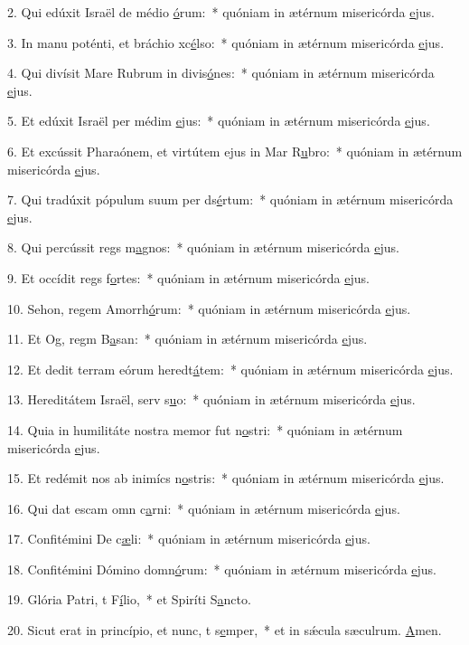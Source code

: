 2. Qui edúxit Israël de médio \uline{ó}rum:~* quóniam in ætérnum misericórda \uline{e}jus.\par 
3. In manu poténti, et bráchio xc\uline{é}lso:~* quóniam in ætérnum misericórda \uline{e}jus.\par 
4. Qui divísit Mare Rubrum in divis\uline{ó}nes:~* quóniam in ætérnum misericórda \uline{e}jus.\par 
5. Et edúxit Israël per médim \uline{e}jus:~* quóniam in ætérnum misericórda \uline{e}jus.\par 
6. Et excússit Pharaónem, et virtútem ejus in Mar R\uline{u}bro:~* quóniam in ætérnum misericórda \uline{e}jus.\par 
7. Qui tradúxit pópulum suum per ds\uline{é}rtum:~* quóniam in ætérnum misericórda \uline{e}jus.\par 
8. Qui percússit regs m\uline{a}gnos:~* quóniam in ætérnum misericórda \uline{e}jus.\par 
9. Et occídit regs f\uline{o}rtes:~* quóniam in ætérnum misericórda \uline{e}jus.\par 
10. Sehon, regem Amorrh\uline{ó}rum:~* quóniam in ætérnum misericórda \uline{e}jus.\par 
11. Et Og, regm B\uline{a}san:~* quóniam in ætérnum misericórda \uline{e}jus.\par 
12. Et dedit terram eórum heredt\uline{á}tem:~* quóniam in ætérnum misericórda \uline{e}jus.\par 
13. Hereditátem Israël, serv s\uline{u}o:~* quóniam in ætérnum misericórda \uline{e}jus.\par 
14. Quia in humilitáte nostra memor fut n\uline{o}stri:~* quóniam in ætérnum misericórda \uline{e}jus.\par 
15. Et redémit nos ab inimícs n\uline{o}stris:~* quóniam in ætérnum misericórda \uline{e}jus.\par 
16. Qui dat escam omn c\uline{a}rni:~* quóniam in ætérnum misericórda \uline{e}jus.\par 
17. Confitémini De c\uline{æ}li:~* quóniam in ætérnum misericórda \uline{e}jus.\par 
18. Confitémini Dómino domn\uline{ó}rum:~* quóniam in ætérnum misericórda \uline{e}jus.\par 
19. Glória Patri, t F\uline{í}lio,~* et Spiríti S\uline{a}ncto.\par 
20. Sicut erat in princípio, et nunc, t s\uline{e}mper,~* et in sǽcula sæculrum. \uline{A}men.\par 
